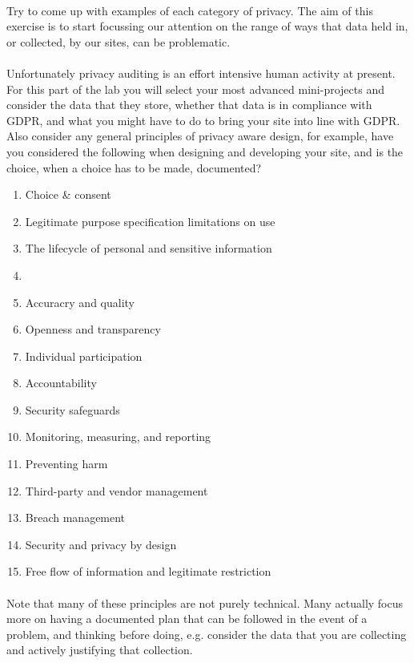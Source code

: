 \documentclass[10pt, a4paper, twosize]{article}
\begin{document}
\paragraph{} Try to come up with examples of each category of privacy. The aim of this exercise is to start focussing our attention on the range of ways that data held in, or collected, by our sites, can be problematic.

\paragraph{} Unfortunately privacy auditing is an effort intensive human activity at present. For this part of the lab you will select your most advanced mini-projects and consider the data that they store, whether that data is in compliance with GDPR, and what you might have to do to bring your site into line with GDPR. Also consider any general principles of privacy aware design, for example, have you considered the following when designing and developing your site, and is the choice, when a choice has to be made, documented?

\begin{enumerate}
\item Choice \& consent
\item Legitimate purpose specification limitations on use
\item The lifecycle of personal and sensitive information\item 
\item Accuracry and quality
\item Openness and transparency
\item Individual participation
\item Accountability
\item Security safeguards
\item Monitoring, measuring, and reporting
\item Preventing harm
\item Third-party and vendor management
\item Breach management
\item Security and privacy by design
\item Free flow of information and legitimate restriction
\end{enumerate}

\paragraph{} Note that many of these principles are not purely technical. Many actually focus more on having a documented plan that can be followed in the event of a problem, and thinking before doing, e.g. consider the data that you are collecting and actively justifying that collection.
\end{document}
